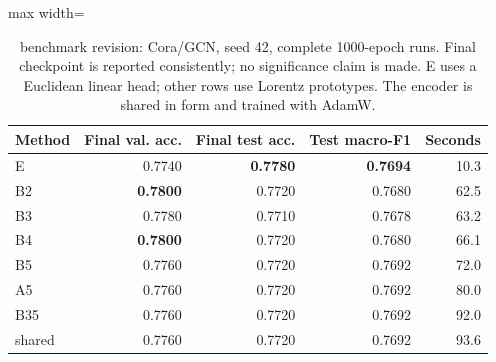 \begin{table}[t]
\centering
\footnotesize\setlength{\tabcolsep}{4.2pt}\renewcommand{\arraystretch}{1.12}
\caption{benchmark revision: Cora/GCN, seed 42, complete 1000-epoch runs. Final checkpoint is reported consistently; no significance claim is made. E uses a Euclidean linear head; other rows use Lorentz prototypes. The encoder is shared in form and trained with AdamW.}
\label{tab:revision-cora}
\begin{adjustbox}{max width=\linewidth}
\begin{tabular}{lrrrr}
\toprule
Method & Final val. acc. & Final test acc. & Test macro-F1 & Seconds \\
\midrule
E & 0.7740 & \textbf{0.7780} & \textbf{0.7694} & 10.3 \\
B2 & \textbf{0.7800} & 0.7720 & 0.7680 & 62.5 \\
B3 & 0.7780 & 0.7710 & 0.7678 & 63.2 \\
B4 & \textbf{0.7800} & 0.7720 & 0.7680 & 66.1 \\
\rowcolor{oursbg}
B5 & 0.7760 & 0.7720 & 0.7692 & 72.0 \\
A5 & 0.7760 & 0.7720 & 0.7692 & 80.0 \\
B35 & 0.7760 & 0.7720 & 0.7692 & 92.0 \\
shared & 0.7760 & 0.7720 & 0.7692 & 93.6 \\
\bottomrule
\end{tabular}
\end{adjustbox}
\end{table}
